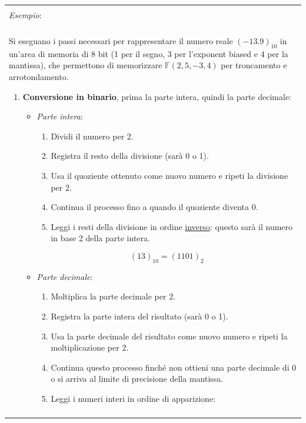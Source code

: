 \documentclass{article}
\newenvironment{example}
{\begin{center}
        \begin{tabular}{|p{0.9\textwidth}|}
            \hline \\ 
            \textit{Esempio}: \\\\ 
        }
        {
            \\\\ \hline
        \end{tabular}
    \end{center}
}
\begin{document}
\begin{example}
    Si eseguano i passi necessari per rappresentare il numero reale
    $(-13.9)_{10}$ in un'area di memoria di 8 bit (1 per il segno, 3 per
    l'exponent biased e 4 per la mantissa), che permettono di memorizzare
    $\mathbb{F}(2,5,-3,4)$ per troncamento e arrotondamento.
    \vskip 0.1in
    \begin{enumerate}
        \item \textbf{Conversione in binario}, prima la parte intera, quindi la parte decimale:
            \begin{itemize}
                \item \textit{Parte intera}:
                    \begin{enumerate}
                        \item Dividi il numero per 2.
                        \item Registra il resto della divisione (sarà 0 o 1).
                        \item Usa il quoziente ottenuto come nuovo numero e
                            ripeti la divisione per 2.
                        \item Continua il processo fino a quando il quoziente
                            diventa 0.
                        \item Leggi i resti della divisione in ordine
                            \underline{inverso}:
                            questo sarà il numero in base 2 della parte
                            intera.
                    \end{enumerate}
                    $$(13)_{10}=(1101)_2$$
                \item \textit{Parte decimale}:
                    \begin{enumerate}
                        \item Moltiplica la parte decimale per 2.
                        \item Registra la parte intera del risultato (sarà 0 o
                            1).
                        \item Usa la parte decimale del risultato come nuovo
                            numero e ripeti la moltiplicazione per 2.
                        \item Continua questo processo finché non ottieni una
                            parte decimale di 0 o si arriva al limite di
                            precisione della mantissa.
                        \item Leggi i numeri interi in ordine di apparizione:

\end{enumerate}
\end{itemize}
\end{enumerate}
\end{example}
\end{document}
